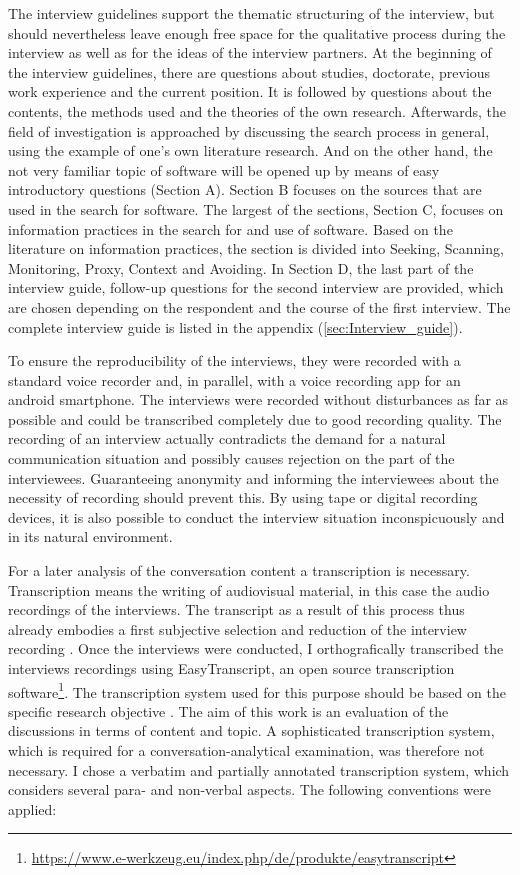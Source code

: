 \documentclass[12pt,a4paper,titlepage,oneside,abstract=true,toc=listof,toc=bibliography]{scrreprt}
\begin{document}
The interview guidelines support the thematic structuring of the interview, but should nevertheless leave enough free space for the qualitative process during the interview as well as for the ideas of the interview partners. At the beginning of the interview guidelines, there are questions about studies, doctorate, previous work experience and the current position. It is followed by questions about the contents, the methods used and the theories of the own research. Afterwards, the field of investigation is approached by discussing the search process in general, using the example of one's own literature research. And on the other hand, the not very familiar topic of software will be opened up by means of easy introductory questions (Section A).  Section B focuses on the sources that are used in the search for software. The largest of the sections, Section C, focuses on information practices in the search for and use of software. Based on the literature on information practices, the section is divided into Seeking, Scanning, Monitoring, Proxy, Context and Avoiding. In Section D, the last part of the interview guide, follow-up questions for the second interview are provided, which are chosen depending on the respondent and the course of the first interview. The complete interview guide is listed in the appendix (\ref{sec:Interview_guide}).

To ensure the reproducibility of the interviews, they were recorded with a standard voice recorder and, in parallel, with a voice recording app for an android smartphone. The interviews were recorded without disturbances as far as possible and could be transcribed completely due to good recording quality. The recording of an interview actually contradicts the demand for a natural communication situation and possibly causes rejection on the part of the interviewees. Guaranteeing anonymity and informing the interviewees about the necessity of recording should prevent this. By using tape or digital recording devices, it is also possible to conduct the interview situation inconspicuously and in its natural environment.

For a later analysis of the conversation content a transcription is necessary. Transcription means the writing of audiovisual material, in this case the audio recordings of the interviews. The transcript as a result of this process thus already embodies a first subjective selection and reduction of the interview recording \citep[p. 321]{Edwards2003}. Once the interviews were conducted, I orthografically transcribed the interviews recordings using EasyTranscript, an open source transcription software\footnote{\url{https://www.e-werkzeug.eu/index.php/de/produkte/easytranscript}}. The transcription system used for this purpose should be based on the specific research objective \citep[p. 331]{Edwards2003}. The aim of this work is an evaluation of the discussions in terms of content and topic. A sophisticated transcription system, which is required for a conversation-analytical examination, was therefore not necessary. I chose a verbatim and partially annotated transcription system, which considers several para- and non-verbal aspects. The following conventions were applied:
\end{document}
